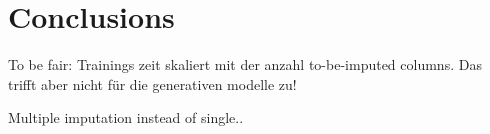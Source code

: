 \section{Conclusions}
\label{sec:conclusion}
To be fair: Trainings zeit skaliert mit der anzahl to-be-imputed columns. Das trifft aber nicht für die generativen modelle zu!

Multiple imputation instead of single..
